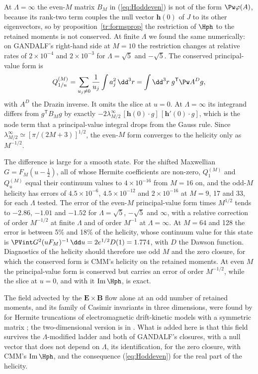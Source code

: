 At $\Lambda=\infty$ the even-$M$ matrix $B_M$ in (\ref{eq:Hoddeven}) is not of the form $\Pw\varphi(A)$, because its rank-two term couples the null vector $\boldsymbol h(0)$ of $J$ to its other eigenvectors, so by proposition~\ref{tr:formsprop} the restriction of $\Hph$ to the retained moments is not conserved. At finite $\Lambda$ we found the same numerically: on GANDALF's right-hand side at $M=10$ the restriction changes at relative rates of $2\times10^{-4}$ and $2\times10^{-3}$ for $\Lambda=\sqrt5$ and $-\sqrt5$. The conserved principal-value form is
\begin{equation*}
  Q^{(M)}_{1/u}=\sum_{u_j\neq0}\frac{1}{u_j}\int a_j^2\,\dd^3r=\int\dd^3r\;g^{\mathsf T}\Pw A^{D}g,
\end{equation*}
with $A^D$ the Drazin inverse. It omits the slice at $u=0$. At $\Lambda=\infty$ its integrand differs from $g^{\mathsf T}B_Mg$ by exactly $-2\lambda^\infty_{M/2}\,[\boldsymbol h(0)\cdot g]\,[\boldsymbol h'(0)\cdot g]$, which is the node term that a principal-value integral drops from the Gauss rule. Since $\lambda^\infty_{M/2}\simeq[\pi/(2M+3)]^{1/2}$, the even-$M$ form converges to the helicity only as $M^{-1/2}$.

The difference is large for a smooth state. For the shifted Maxwellian $G=F_M(u-\frac12)$, all of whose Hermite coefficients are non-zero, $Q^{(M)}_1$ and $Q^{(M)}_u$ equal their continuum values to $4\times10^{-16}$ from $M=16$ on, and the odd-$M$ helicity has errors of $4.5\times10^{-6}$, $4.5\times10^{-12}$ and $2\times10^{-16}$ at $M=9$, 17 and 33, for each $\Lambda$ tested. The error of the even-$M$ principal-value form times $M^{1/2}$ tends to $-2.86$, $-1.01$ and $-1.52$ for $\Lambda=\sqrt5$, $-\sqrt5$ and $\infty$, with a relative correction of order $M^{-1/2}$ at finite $\Lambda$ and of order $M^{-1}$ at $\Lambda=\infty$. At $M=64$ and 128 the error is between 5\% and 18\% of the helicity, whose continuum value for this state is $\PVint G^2(uF_M)^{-1}\,\dd u=2e^{1/2}D(1)=1.774$, with $D$ the Dawson function. Diagnostics of the helicity should therefore use odd $M$ and the zero closure, for which the conserved form is CMM's helicity on the retained moments. At even $M$ the principal-value form is conserved but carries an error of order $M^{-1/2}$, while the slice at $u=0$, and with it $\mathrm{Im}\,\Hph$, is exact.

The field advected by the $\boldsymbol E\times\boldsymbol B$ flow alone at an odd number of retained moments, and its family of Casimir invariants in three dimensions, were found by \citet{Tassi2022} for Hermite truncations of electromagnetic drift-kinetic models with a symmetric matrix \citep[see also][]{Tassi2023}; the two-dimensional version is in \citet{Tassi2015}. What is added here is that this field survives the $\Lambda$-modified ladder and both of GANDALF's closures, with a null vector that does not depend on $\Lambda$, its identification, for the zero closure, with CMM's $\mathrm{Im}\,\Hph$, and the consequence (\ref{eq:Hoddeven}) for the real part of the helicity.


